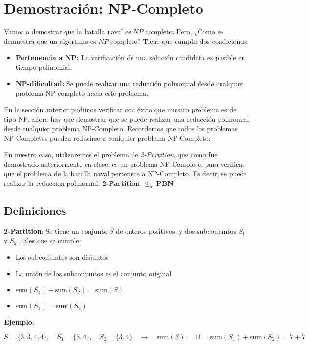 \section{Demostración: NP-Completo}

Vamos a demostrar que la batalla naval es $NP$ completo. Pero, ¿Como se demuestra que un algortimo es $NP$ completo? Tiene que cumplir dos condiciones: 

\begin{itemize}
    \item \textbf{Pertenencia a NP:} La verificación de una solución candidata es posible en tiempo polinomial.
    \item \textbf{NP-dificultad:} Se puede realizar una reducción polinomial desde cualquier problema NP-completo hacia este problema.
\end{itemize}

En la sección anterior pudimos verificar con éxito que nuestro problema es de tipo NP, ahora hay que demostrar que se puede realizar una reducción polinomial desde cualquier problema NP-Completo. Recordemos que todos los problemas NP-Completos pueden reducirse a cualquier problema NP-Completo. 

En nuestro caso, utilizaremos el problema de \textit{2-Partition}, que como fue demostrado anteriormente en clase, es un problema NP-Completo, para verificar que el problema de la batalla naval pertenece a NP-Completo. Es decir, se puede realizar la reduccion polinomial: \textbf{2-Partition} $\leq_p$ \textbf{PBN}
\vskip0.5cm
\subsection*{Definiciones}

\textbf{2-Partition}: Se tiene un conjunto $S$ de enteros positivos, y dos subconjuntos $S_1$ y $S_2$, tales que se cumple:
\begin{itemize}
    \item Los subconjuntos son disjuntos
    \item La unión de los subconjuntos es el conjunto original
    \item $\text{sum}(S_1) + \text{sum}(S_2) = \text{sum}(S)$
    \item $\text{sum}(S_1) = \text{sum}(S_2)$
\end{itemize}

\textbf{Ejemplo}:

$S =\{3, 3, 4, 4\},\quad S_1 = \{3, 4\},\quad S_2 = \{3, 4\} \quad \rightarrow \quad \text{sum}(S)= 14 = \text{sum}(S_1) + \text{sum}(S_2) = 7 + 7$

